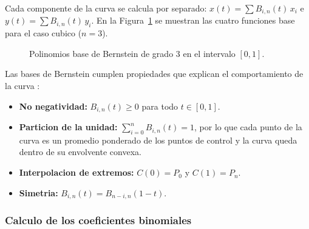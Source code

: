 Cada componente de la curva se calcula por separado: $x(t) = \sum B_{i,n}(t)\, x_i$ e $y(t) = \sum B_{i,n}(t)\, y_i$. En la Figura~\ref{fig:fund_bases} se muestran las cuatro funciones base para el caso cubico ($n = 3$).

\begin{figure}[H]
\centering
{}
\caption{Polinomios base de Bernstein de grado 3 en el intervalo $[0, 1]$.}
\label{fig:fund_bases}
\end{figure}

Las bases de Bernstein cumplen propiedades que explican el comportamiento de la curva \cite{farin2002}:
\begin{itemize}
  \item \textbf{No negatividad:} $B_{i,n}(t) \ge 0$ para todo $t \in [0, 1]$.
  \item \textbf{Particion de la unidad:} $\sum_{i=0}^{n} B_{i,n}(t) = 1$, por lo que cada punto de la curva es un promedio ponderado de los puntos de control y la curva queda dentro de su envolvente convexa.
  \item \textbf{Interpolacion de extremos:} $C(0) = P_0$ y $C(1) = P_n$.
  \item \textbf{Simetria:} $B_{i,n}(t) = B_{n-i,n}(1 - t)$.
\end{itemize}

\subsubsection{Calculo de los coeficientes binomiales}

